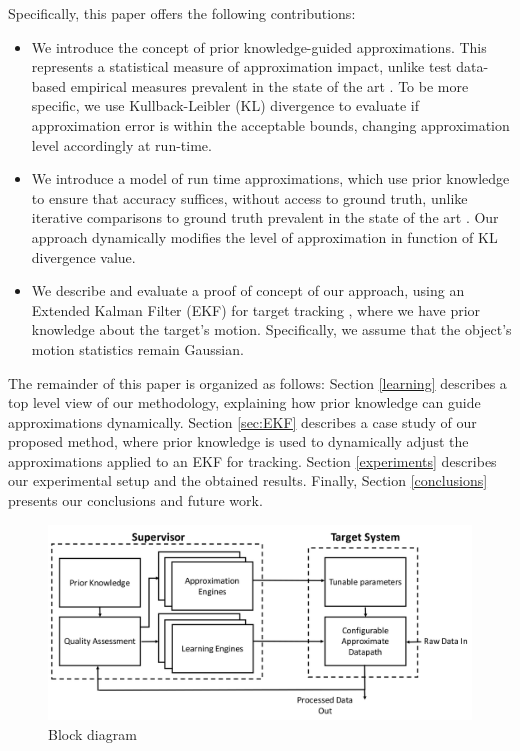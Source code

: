 \par Specifically, this paper offers the following contributions:

\begin{itemize}
\item	We introduce the concept of prior knowledge-guided approximations. This represents a statistical measure of approximation impact, unlike test data-based empirical measures prevalent in the state of the art \cite{nepal2016automated}. To be more specific, we use Kullback-Leibler (KL) divergence to evaluate if approximation error is within the acceptable bounds, changing approximation level accordingly at run-time.
\item	We introduce a model of run time approximations, which use prior knowledge to ensure that accuracy suffices, without access to ground truth, unlike iterative comparisons to ground truth prevalent in the state of the art \cite{mittal2016survey,yazdanbakhsh2017axbench}. Our approach dynamically modifies the level of approximation in function of KL divergence value.
\item 	We describe and evaluate a proof of concept of our approach, using an Extended Kalman Filter (EKF) for target tracking \cite{kulikov2016accurate}, where we have prior knowledge about the target's motion. Specifically, we assume that the object's motion statistics remain Gaussian.
\end{itemize}

\par The remainder of this paper is organized as follows: Section \ref{learning} describes a top level view of our methodology, explaining how prior knowledge can guide approximations dynamically. Section \ref{sec:EKF} describes a case study of our proposed method, where prior knowledge is used to dynamically adjust the approximations applied to an EKF for tracking. Section \ref{experiments} describes our experimental setup and the obtained results. Finally, Section \ref{conclusions} presents our conclusions and future work. 


\begin{figure}[tb]
  \centering
  \includegraphics[width=\columnwidth]{img/block_diagram.png}
  \caption{Block diagram}
  \label{fig:block_diagram}
\end{figure}
